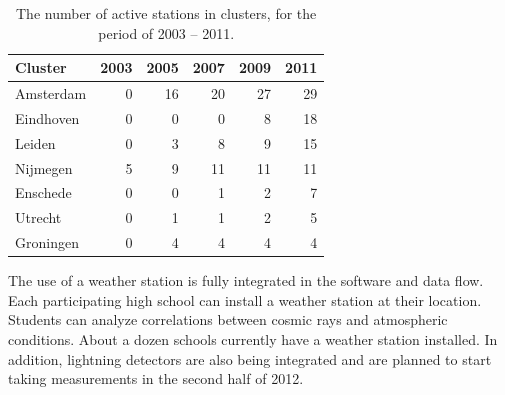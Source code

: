 \begin{table}
\centering
\begin{tabular}{@{}lrrrrr@{}}
\toprule
Cluster & 2003 & 2005 & 2007 & 2009 & 2011 \\
\midrule
Amsterdam & 0 & 16 & 20 & 27 & 29 \\
Eindhoven & 0 & 0 & 0 & 8 & 18 \\
Leiden & 0 & 3 & 8 & 9 & 15 \\
Nijmegen & 5 & 9 & 11 & 11 & 11 \\
Enschede & 0 & 0 & 1 & 2 & 7 \\
Utrecht & 0 & 1 & 1 & 2 & 5 \\
Groningen & 0 & 4 & 4 & 4 & 4 \\
\bottomrule
\end{tabular}
\caption{The number of active stations in \hisparc clusters, for the period of
2003 -- 2011.}
\label{tab:stations-per-cluster}
\end{table}

The use of a weather station is fully integrated in the \hisparc software and
data flow. Each participating high school can install a weather station at their
location. Students can analyze correlations between cosmic rays and atmospheric
conditions. About a dozen schools currently have a weather station installed.
In addition, lightning detectors are also being integrated and are planned to
start taking measurements in the second half of 2012.
